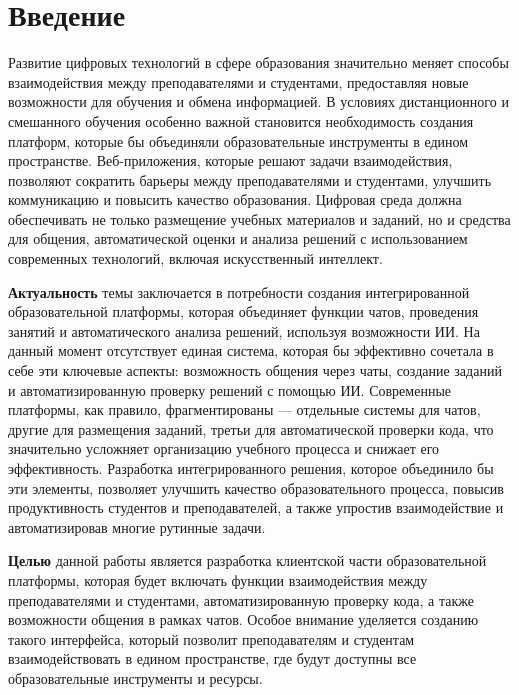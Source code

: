 \newpage
{}
\section*{Введение}

Развитие цифровых технологий в сфере образования значительно меняет способы взаимодействия между преподавателями и студентами, предоставляя новые возможности для обучения и обмена информацией. В условиях дистанционного и смешанного обучения особенно важной становится необходимость создания платформ, которые бы объединяли образовательные инструменты в едином пространстве. Веб-приложения, которые решают задачи взаимодействия, позволяют сократить барьеры между преподавателями и студентами, улучшить коммуникацию и повысить качество образования. Цифровая среда должна обеспечивать не только размещение учебных материалов и заданий, но и средства для общения, автоматической оценки и анализа решений с использованием современных технологий, включая искусственный интеллект.

\textbf{Актуальность} темы заключается в потребности создания интегрированной образовательной платформы, которая объединяет функции чатов, проведения занятий и автоматического анализа решений, используя возможности ИИ. На данный момент отсутствует единая система, которая бы эффективно сочетала в себе эти ключевые аспекты: возможность общения через чаты, создание заданий и автоматизированную проверку решений с помощью ИИ. Современные платформы, как правило, фрагментированы — отдельные системы для чатов, другие для размещения заданий, третьи для автоматической проверки кода, что значительно усложняет организацию учебного процесса и снижает его эффективность. Разработка интегрированного решения, которое объединило бы эти элементы, позволяет улучшить качество образовательного процесса, повысив продуктивность студентов и преподавателей, а также упростив взаимодействие и автоматизировав многие рутинные задачи.

\textbf{Целью} данной работы является разработка клиентской части образовательной платформы, которая будет включать функции взаимодействия между преподавателями и студентами, автоматизированную проверку кода, а также возможности общения в рамках чатов. Особое внимание уделяется созданию такого интерфейса, который позволит преподавателям и студентам взаимодействовать в едином пространстве, где будут доступны все образовательные инструменты и ресурсы.

